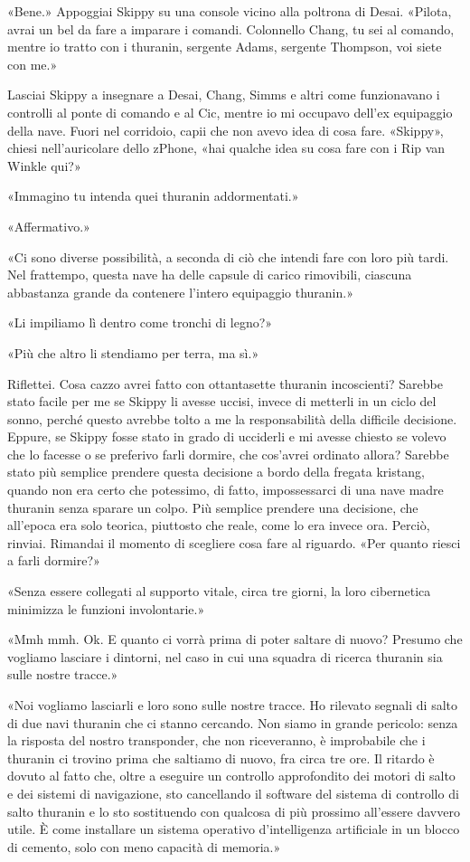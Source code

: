 «Bene.» Appoggiai Skippy su una console vicino alla poltrona di Desai.
«Pilota, avrai un bel da fare a imparare i comandi. Colonnello Chang, tu
sei al comando, mentre io tratto con i thuranin, sergente Adams,
sergente Thompson, voi siete con me.»

\hfill\break

Lasciai Skippy a insegnare a Desai, Chang, Simms e altri come
funzionavano i controlli al ponte di comando e al Cic, mentre io mi
occupavo dell'ex equipaggio della nave. Fuori nel corridoio, capii che
non avevo idea di cosa fare. «Skippy», chiesi nell'auricolare dello
zPhone, «hai qualche idea su cosa fare con i Rip van Winkle qui?»

«Immagino tu intenda quei thuranin addormentati.»

«Affermativo.»

«Ci sono diverse possibilità, a seconda di ciò che intendi fare con loro
più tardi. Nel frattempo, questa nave ha delle capsule di carico
rimovibili, ciascuna abbastanza grande da contenere l'intero equipaggio
thuranin.»

«Li impiliamo lì dentro come tronchi di legno?»

«Più che altro li stendiamo per terra, ma sì.»

Riflettei. Cosa cazzo avrei fatto con ottantasette thuranin incoscienti?
Sarebbe stato facile per me se Skippy li avesse uccisi, invece di
metterli in un ciclo del sonno, perché questo avrebbe tolto a me la
responsabilità della difficile decisione. Eppure, se Skippy fosse stato
in grado di ucciderli e mi avesse chiesto se volevo che lo facesse o se
preferivo farli dormire, che cos'avrei ordinato allora? Sarebbe stato
più semplice prendere questa decisione a bordo della fregata kristang,
quando non era certo che potessimo, di fatto, impossessarci di una nave
madre thuranin senza sparare un colpo. Più semplice prendere una
decisione, che all'epoca era solo teorica, piuttosto che reale, come lo
era invece ora. Perciò, rinviai. Rimandai il momento di scegliere cosa
fare al riguardo. «Per quanto riesci a farli dormire?»

«Senza essere collegati al supporto vitale, circa tre giorni, la loro
cibernetica minimizza le funzioni involontarie.»

«Mmh mmh. Ok. E quanto ci vorrà prima di poter saltare di nuovo? Presumo
che vogliamo lasciare i dintorni, nel caso in cui una squadra di ricerca
thuranin sia sulle nostre tracce.»

«Noi vogliamo lasciarli e loro sono sulle nostre tracce. Ho rilevato
segnali di salto di due navi thuranin che ci stanno cercando. Non siamo
in grande pericolo: senza la risposta del nostro transponder, che non
riceveranno, è improbabile che i thuranin ci trovino prima che saltiamo
di nuovo, fra circa tre ore. Il ritardo è dovuto al fatto che, oltre a
eseguire un controllo approfondito dei motori di salto e dei sistemi di
navigazione, sto cancellando il software del sistema di controllo di
salto thuranin e lo sto sostituendo con qualcosa di più prossimo
all'essere davvero utile. È come installare un sistema operativo
d'intelligenza artificiale in un blocco di cemento, solo con meno
capacità di memoria.»

